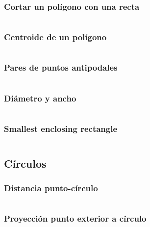 \documentclass[11pt]{article}
\begin{document}
			\subsubsection{Cortar un polígono con una recta}
			\inputminted[tabsize=2,breaklines,firstline=226,lastline=242,fontsize=\small]{c++}{geometry.cpp}
			
			\subsubsection{Centroide de un polígono}
			\inputminted[tabsize=2,breaklines,firstline=259,lastline=269,fontsize=\small]{c++}{geometry.cpp}
			
			\subsubsection{Pares de puntos antipodales}
			\inputminted[tabsize=2,breaklines,firstline=271,lastline=282,fontsize=\small]{c++}{geometry.cpp}
			
			\subsubsection{Diámetro y ancho}
			\inputminted[tabsize=2,breaklines,firstline=284,lastline=298,fontsize=\small]{c++}{geometry.cpp}
			
			\subsubsection{Smallest enclosing rectangle}
			\inputminted[tabsize=2,breaklines,firstline=300,lastline=319,fontsize=\small]{c++}{geometry.cpp}
		
		\subsection{Círculos}
			\subsubsection{Distancia punto-círculo}
			\inputminted[tabsize=2,breaklines,firstline=321,lastline=324,fontsize=\small]{c++}{geometry.cpp}
			
			\subsubsection{Proyección punto exterior a círculo}
			\inputminted[tabsize=2,breaklines,firstline=326,lastline=329,fontsize=\small]{c++}{geometry.cpp}
			
\end{document}
